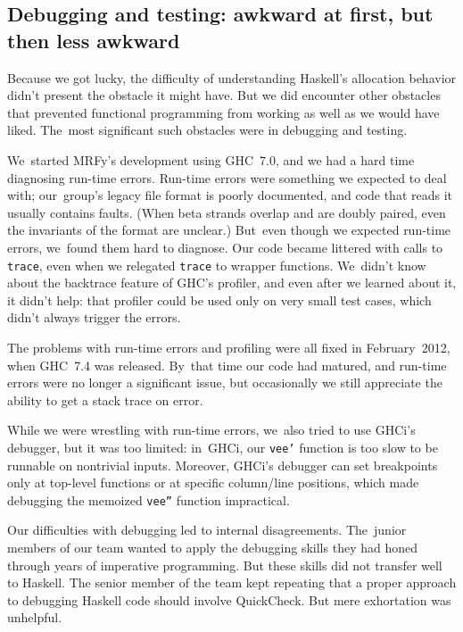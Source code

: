 \documentclass[]{jfp1}
\newcommand\mrfy{MRFy} %
\newcommand\seclabel[1]{\label{sec:#1}}
\begin{document}
\subsection{Debugging and testing: awkward at first, but then  less awkward}

\seclabel{awkward-profiling}

Because we got lucky, the difficulty of understanding Haskell's
allocation behavior didn't present the obstacle it might have.
But we did encounter other obstacles that prevented functional
programming from working as well as we would have liked.
The~most significant such obstacles were in debugging and testing.

We~started \mrfy's development using GHC~7.0, and
we had a hard time diagnosing run-time errors.
Run-time errors were something we expected to deal with;
our~group's legacy file
format is poorly documented, and code that reads it usually contains
faults. 
(When beta
strands overlap and are doubly paired, even the invariants of the
format are unclear.)
But~even though we expected run-time errors, we~found them hard to diagnose.
Our code became littered with
calls to
\texttt{trace}, 
even when we relegated \texttt{trace} to wrapper functions.
We~didn't know about the backtrace feature of GHC's profiler,
and even after we learned about it, it didn't help:
that profiler could be used only on very small test cases,
which didn't always trigger the errors.

The problems with run-time errors and profiling were all fixed in
February~2012, when GHC~7.4 was released.
By~that time our code had matured, and run-time errors were no longer
a significant issue, but occasionally we still appreciate the ability 
to get a stack trace on error.

While we were wrestling with run-time errors, we~also tried to use
GHCi's debugger, but it was too limited:
in~GHCi, our \texttt{vee'} function
is too slow to be runnable on nontrivial
inputs.
Moreover,  GHCi's debugger can set breakpoints only at top-level functions
or at specific column/line positions, which made debugging the memoized
\texttt{vee''} function impractical.

Our difficulties with debugging led to internal disagreements.
The~junior members of our team wanted to apply the debugging
skills they had honed through years of imperative programming.
But these skills did not transfer well to Haskell.
The senior member of the team kept repeating that a proper approach to
debugging Haskell code should involve QuickCheck.
But mere exhortation was unhelpful.
\end{document}
